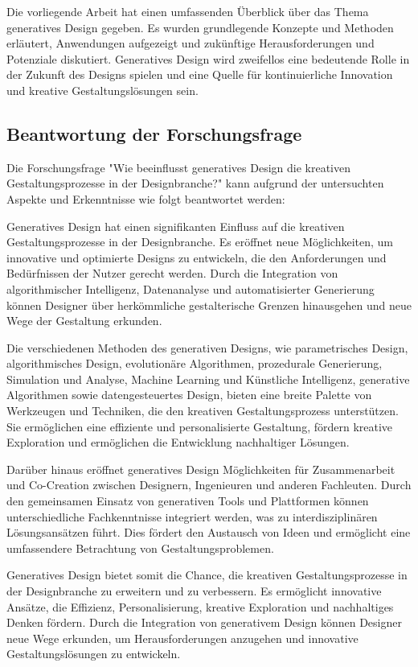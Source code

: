 Die vorliegende Arbeit hat einen umfassenden Überblick über das Thema generatives Design gegeben. Es wurden grundlegende Konzepte und Methoden erläutert, Anwendungen aufgezeigt und zukünftige Herausforderungen und Potenziale diskutiert. Generatives Design wird zweifellos eine bedeutende Rolle in der Zukunft des Designs spielen und eine Quelle für kontinuierliche Innovation und kreative Gestaltungslösungen sein.

\subsection*{Beantwortung der Forschungsfrage}

Die Forschungsfrage "Wie beeinflusst generatives Design die kreativen Gestaltungsprozesse in der Designbranche?" kann aufgrund der untersuchten Aspekte und Erkenntnisse wie folgt beantwortet werden:

Generatives Design hat einen signifikanten Einfluss auf die kreativen Gestaltungsprozesse in der Designbranche. Es eröffnet neue Möglichkeiten, um innovative und optimierte Designs zu entwickeln, die den Anforderungen und Bedürfnissen der Nutzer gerecht werden. Durch die Integration von algorithmischer Intelligenz, Datenanalyse und automatisierter Generierung können Designer über herkömmliche gestalterische Grenzen hinausgehen und neue Wege der Gestaltung erkunden.

Die verschiedenen Methoden des generativen Designs, wie parametrisches Design, algorithmisches Design, evolutionäre Algorithmen, prozedurale Generierung, Simulation und Analyse, Machine Learning und Künstliche Intelligenz, generative Algorithmen sowie datengesteuertes Design, bieten eine breite Palette von Werkzeugen und Techniken, die den kreativen Gestaltungsprozess unterstützen. Sie ermöglichen eine effiziente und personalisierte Gestaltung, fördern kreative Exploration und ermöglichen die Entwicklung nachhaltiger Lösungen.

Darüber hinaus eröffnet generatives Design Möglichkeiten für Zusammenarbeit und Co-Creation zwischen Designern, Ingenieuren und anderen Fachleuten. Durch den gemeinsamen Einsatz von generativen Tools und Plattformen können unterschiedliche Fachkenntnisse integriert werden, was zu interdisziplinären Lösungsansätzen führt. Dies fördert den Austausch von Ideen und ermöglicht eine umfassendere Betrachtung von Gestaltungsproblemen.

Generatives Design bietet somit die Chance, die kreativen Gestaltungsprozesse in der Designbranche zu erweitern und zu verbessern. Es ermöglicht innovative Ansätze, die Effizienz, Personalisierung, kreative Exploration und nachhaltiges Denken fördern. Durch die Integration von generativem Design können Designer neue Wege erkunden, um Herausforderungen anzugehen und innovative Gestaltungslösungen zu entwickeln.

